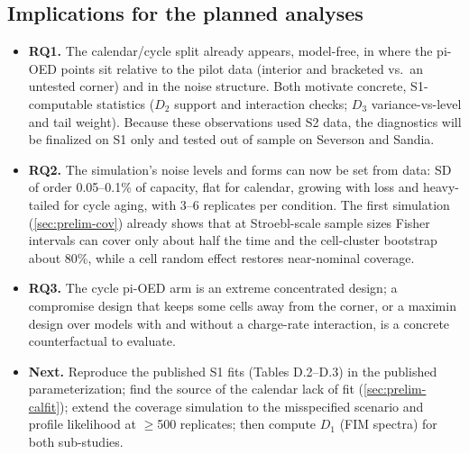 \documentclass[11pt,letterpaper]{article}
\newcommand{\RQ}[1]{\textbf{RQ#1}}
\begin{document}
\subsection{Implications for the planned analyses}
\begin{itemize}
  \item \textbf{\RQ1.} The calendar/cycle split already appears, model-free, in where the pi-OED points sit relative to the pilot data (interior and bracketed vs.\ an untested corner) and in the noise structure. Both motivate concrete, S1-computable statistics ($D_2$ support and interaction checks; $D_3$ variance-vs-level and tail weight). Because these observations used S2 data, the diagnostics will be finalized on S1 only and tested out of sample on Severson and Sandia.
  \item \textbf{\RQ2.} The simulation's noise levels and forms can now be set from data: SD of order 0.05--0.1\% of capacity, flat for calendar, growing with loss and heavy-tailed for cycle aging, with 3--6 replicates per condition. The first simulation (\cref{sec:prelim-cov}) already shows that at Stroebl-scale sample sizes Fisher intervals can cover only about half the time and the cell-cluster bootstrap about 80\%, while a cell random effect restores near-nominal coverage.
  \item \textbf{\RQ3.} The cycle pi-OED arm is an extreme concentrated design; a compromise design that keeps some cells away from the corner, or a maximin design over models with and without a charge-rate interaction, is a concrete counterfactual to evaluate.
  \item \textbf{Next.} Reproduce the published S1 fits (Tables D.2--D.3) in the published parameterization; find the source of the calendar lack of fit (\cref{sec:prelim-calfit}); extend the coverage simulation to the misspecified scenario and profile likelihood at $\ge$500 replicates; then compute $D_1$ (FIM spectra) for both sub-studies.
\end{itemize}

\end{document}
